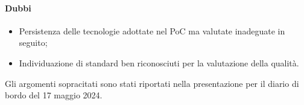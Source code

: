 \paragraph{Dubbi}
\begin{itemize}
	\item Persistenza delle tecnologie adottate nel PoC ma valutate inadeguate in seguito;
	\item Individuazione di standard ben riconosciuti per la valutazione della qualità.
\end{itemize}

\par Gli argomenti sopracitati sono stati riportati nella presentazione per il diario di bordo del 17 maggio 2024.
